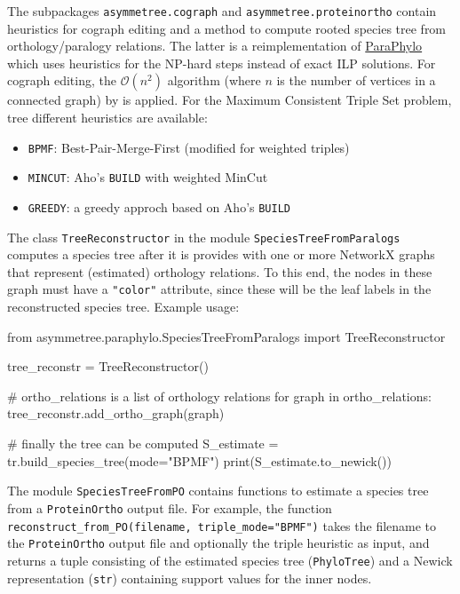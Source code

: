 \documentclass[hidelinks,11pt]{scrreprt}
\begin{document}
The subpackages \texttt{asymmetree.cograph} and \texttt{asymmetree.proteinortho} contain heuristics for cograph editing and a method to compute rooted species tree from orthology/paralogy relations.
The latter is a reimplementation of \href{http://pacosy.informatik.uni-leipzig.de/208-0-ParaPhylo.html}{ParaPhylo} \citep{hellmuth2015} which uses heuristics for the NP-hard steps instead of exact ILP solutions.
For cograph editing, the $\mathcal{O}(n^2)$ algorithm (where $n$ is the number of vertices in a connected graph) by \citet{crespelle2019} is applied.
For the Maximum Consistent Triple Set problem, tree different heuristics are available:
\begin{itemize}
	\item \texttt{BPMF}: Best-Pair-Merge-First \citep{wu2004} (modified for weighted triples)
	\item \texttt{MINCUT}: Aho's \texttt{BUILD} with weighted MinCut \citep{aho1981,byrka2010}
	\item \texttt{GREEDY}: a greedy approch based on Aho's \texttt{BUILD}
\end{itemize}

The class \texttt{TreeReconstructor} in the module \texttt{SpeciesTreeFromParalogs} computes a species tree after it is provides with one or more NetworkX graphs that represent (estimated) orthology relations.
To this end, the nodes in these graph must have a \texttt{"color"} attribute, since these will be the leaf labels in the reconstructed species tree.
Example usage:
\begin{python}
from asymmetree.paraphylo.SpeciesTreeFromParalogs import TreeReconstructor

tree_reconstr = TreeReconstructor()

# ortho_relations is a list of orthology relations
for graph in ortho_relations:
    tree_reconstr.add_ortho_graph(graph)
    
# finally the tree can be computed
S_estimate = tr.build_species_tree(mode="BPMF")
print(S_estimate.to_newick())
\end{python}
\vspace{2mm}

The module \texttt{SpeciesTreeFromPO} contains functions to estimate a species tree from a \texttt{ProteinOrtho} output file. For example, the function \texttt{reconstruct\_from\_PO(filename, triple\_mode="BPMF")} takes the filename to the \texttt{ProteinOrtho} output file and optionally the triple heuristic as input, and returns a tuple consisting of the estimated species tree (\texttt{PhyloTree}) and a Newick representation (\texttt{str}) containing support values for the inner nodes.
\end{document}
